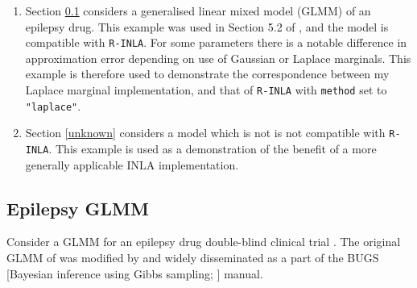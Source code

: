 \documentclass[a4paper, nobind]{templates/ociamthesis}
\providecommand{\tightlist}{%
  \setlength{\itemsep}{0pt}\setlength{\parskip}{0pt}}
\begin{document}
\begin{enumerate}
\def\labelenumi{\arabic{enumi}.}
\tightlist
\item
  Section \ref{epil} considers a generalised linear mixed model (GLMM) of an epilepsy drug.
  This example was used in Section 5.2 of \textcite{rue2009approximate}, and the model is compatible with \texttt{R-INLA}.
  For some parameters there is a notable difference in approximation error depending on use of Gaussian or Laplace marginals.
  This example is therefore used to demonstrate the correspondence between my Laplace marginal implementation, and that of \texttt{R-INLA} with \texttt{method} set to \texttt{"laplace"}.
\item
  Section \ref{unknown} considers a model which is not is not compatible with \texttt{R-INLA}.
  This example is used as a demonstration of the benefit of a more generally applicable INLA implementation.
\end{enumerate}

\hypertarget{epil}{%
\subsection{Epilepsy GLMM}\label{epil}}

Consider a GLMM for an epilepsy drug double-blind clinical trial \autocite{leppik1985double}.
The original GLMM of \textcite{thall1990some} was modified by \textcite{breslow1993approximate} and widely disseminated as a part of the BUGS {[}Bayesian inference using Gibbs sampling; \textcite{spiegelhalter1996bugs}{]} manual.
\end{document}
